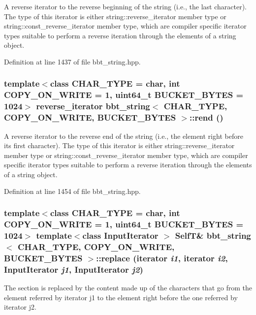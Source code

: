 A reverse iterator to the reverse beginning of the string (i.e., the last character). The type of this iterator is either string::reverse\_\-iterator member type or string::const\_\-reverse\_\-iterator member type, which are compiler specific iterator types suitable to perform a reverse iteration through the elements of a string object. 

Definition at line 1437 of file bbt\_\-string.hpp.\hypertarget{classbbt__string_7f39c0149a22f0d7b9fe1ce776fa2605}{
\subsubsection[{rend}]{\setlength{\rightskip}{0pt plus 5cm}template$<$class CHAR\_\-TYPE  = char, int COPY\_\-ON\_\-WRITE = 1, uint64\_\-t BUCKET\_\-BYTES = 1024$>$ reverse\_\-iterator {\bf bbt\_\-string}$<$ CHAR\_\-TYPE, COPY\_\-ON\_\-WRITE, BUCKET\_\-BYTES $>$::rend ()}}
\label{classbbt__string_7f39c0149a22f0d7b9fe1ce776fa2605}


A reverse iterator to the reverse end of the string (i.e., the element right before its first character). The type of this iterator is either string::reverse\_\-iterator member type or string::const\_\-reverse\_\-iterator member type, which are compiler specific iterator types suitable to perform a reverse iteration through the elements of a string object. 

Definition at line 1454 of file bbt\_\-string.hpp.\hypertarget{classbbt__string_8bf848ea75290e5ddfe4983b71919efb}{
\subsubsection[{replace}]{\setlength{\rightskip}{0pt plus 5cm}template$<$class CHAR\_\-TYPE  = char, int COPY\_\-ON\_\-WRITE = 1, uint64\_\-t BUCKET\_\-BYTES = 1024$>$ template$<$class InputIterator $>$ {\bf SelfT}\& {\bf bbt\_\-string}$<$ CHAR\_\-TYPE, COPY\_\-ON\_\-WRITE, BUCKET\_\-BYTES $>$::replace (iterator {\em i1}, \/  iterator {\em i2}, \/  InputIterator {\em j1}, \/  InputIterator {\em j2})}}
\label{classbbt__string_8bf848ea75290e5ddfe4983b71919efb}


The section is replaced by the content made up of the characters that go from the element referred by iterator j1 to the element right before the one referred by iterator j2. 

